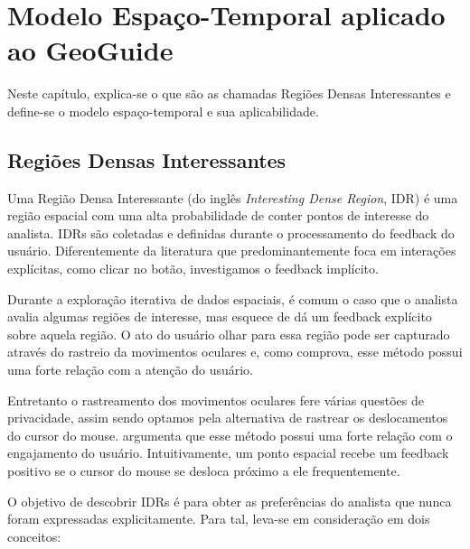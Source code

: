 \chapter{Modelo Espaço-Temporal aplicado ao GeoGuide}
\label{chap:modelo}



Neste capítulo, explica-se o que são as chamadas Regiões Densas Interessantes e define-se o modelo espaço-temporal e sua aplicabilidade.

\section{Regiões Densas Interessantes}


Uma Região Densa Interessante (do inglês {\em Interesting Dense Region}, IDR) é uma região espacial com uma alta probabilidade de conter pontos de interesse do analista. IDRs são coletadas e definidas durante o processamento do feedback do usuário. Diferentemente da literatura que predominantemente foca em interações explícitas, como clicar no botão, investigamos o feedback implícito.

Durante a exploração iterativa de dados espaciais, é comum o caso que o analista avalia algumas regiões de interesse, mas esquece de dá um feedback explícito sobre aquela região. O ato do usuário olhar para essa região pode ser capturado através do rastreio da movimentos oculares e, como  comprova, esse método possui uma forte relação com a atenção do usuário.

Entretanto o rastreamento dos movimentos oculares fere várias questões de privacidade, assim sendo optamos pela alternativa de rastrear os deslocamentos do cursor do mouse.  argumenta que esse método possui uma forte relação com o engajamento do usuário. Intuitivamente, um ponto espacial recebe um feedback positivo se o cursor do mouse se desloca próximo a ele frequentemente.

O objetivo de descobrir IDRs é para obter as preferências do analista que nunca foram expressadas explicitamente. Para tal, leva-se em consideração em dois conceitos:

